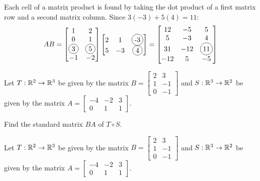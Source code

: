 \begin{applicationActivities}
\begin{observation}
  Each cell of a matrix product is found by taking the dot product
  of a first matrix row and a second matrix column. Since
  \(3(-3)+5(4)=11\):
  \[
    AB
      =
    \begin{bmatrix} 1 & 2 \\ 0 & 1 \\ \circledNumber{3} & \circledNumber{5} \\ -1 & -2 \end{bmatrix}
    \begin{bmatrix} 2 & 1 & \circledNumber{-3} \\ 5 & -3 & \circledNumber{4} \end{bmatrix}
      =
    \begin{bmatrix}
      12 & -5 & 5 \\
      5 & -3 & 4 \\
      31 & -12 & \circledNumber{11} \\
      -12 & 5 & -5
    \end{bmatrix}
  \]
\end{observation}



\begin{activity}{10}
Let $T: \mathbb{R}^2 \rightarrow \mathbb{R}^3$ be given by the matrix $B=\begin{bmatrix} 2 & 3 \\ 1 & -1 \\ 0 & -1 \end{bmatrix}$ and $S: \mathbb{R}^3 \rightarrow \mathbb{R}^2$ be given by the matrix $A=\begin{bmatrix} -4 & -2 & 3 \\ 0 & 1 & 1 \end{bmatrix}$.

Find the standard matrix \(BA\) of $T \circ S$.
\end{activity}

\begin{activity}{5}
Let $T: \mathbb{R}^2 \rightarrow \mathbb{R}^3$ be given by the matrix $B=\begin{bmatrix} 2 & 3 \\ 1 & -1 \\ 0 & -1 \end{bmatrix}$ and $S: \mathbb{R}^3 \rightarrow \mathbb{R}^2$ be given by the matrix $A=\begin{bmatrix} -4 & -2 & 3 \\ 0 & 1 & 1 \end{bmatrix}$.


\end{activity}
\end{applicationActivities}
